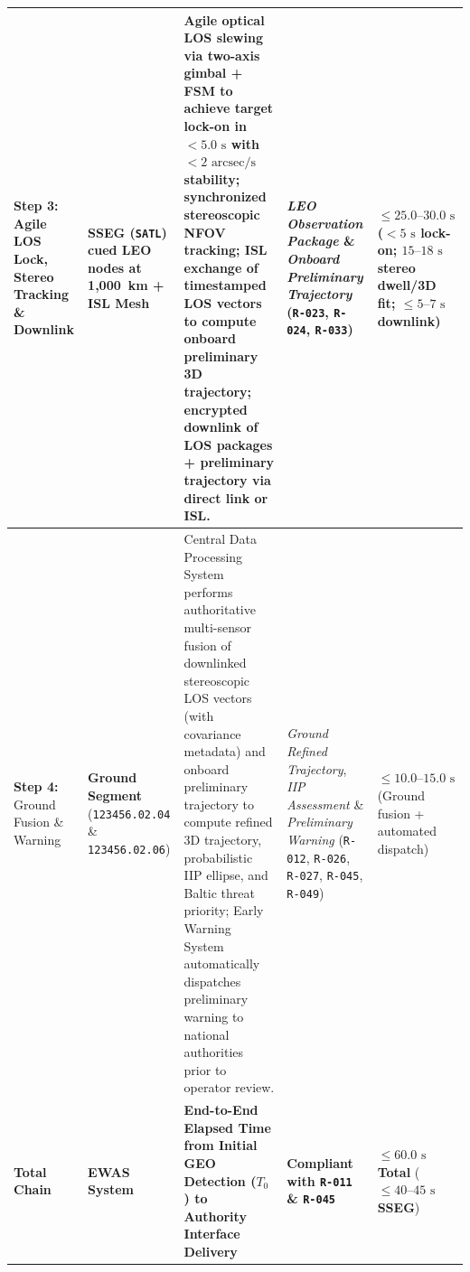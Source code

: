 \documentclass[11pt,a4paper]{article}
\providecommand{\abbr}[1]{#1}
\begin{document}
\begin{table}[H]
{\begin{tabularx}{\textwidth}{|>{\raggedright\arraybackslash}p{2.1cm}|>{\raggedright\arraybackslash}p{2.2cm}|>{\raggedright\arraybackslash}X|>{\raggedright\arraybackslash}p{2.3cm}|>{\raggedright\arraybackslash}p{1.9cm}|}
    \textbf{Step 3:} \newline Agile \abbr{LOS} Lock, Stereo Tracking \& Downlink & \textbf{SSEG (\texttt{SATL})} \newline 2 cued \abbr{LEO} nodes at 1,000~km + \textbf{\abbr{ISL} Mesh} & Agile optical \abbr{LOS} slewing via two-axis gimbal + \abbr{FSM} to achieve target lock-on in $< 5.0\text{ s}$ with $< 2\text{ arcsec/s}$ stability; synchronized stereoscopic \abbr{NFOV} tracking; \abbr{ISL} exchange of timestamped \abbr{LOS} vectors to compute onboard preliminary 3D trajectory; encrypted downlink of \abbr{LOS} packages + preliminary trajectory via direct link or \abbr{ISL}. & \emph{LEO Observation Package} \& \emph{Onboard Preliminary Trajectory} \newline (\texttt{R-023}, \texttt{R-024}, \texttt{R-033}) & \textbf{$\le 25.0\text{--}30.0\text{ s}$} \newline ($< 5\text{ s}$ lock-on; $15\text{--}18\text{ s}$ stereo dwell/3D fit; $\le 5\text{--}7\text{ s}$ downlink) \\ \hline
    \textbf{Step 4:} \newline Ground Fusion \& Warning & \textbf{Ground Segment} \newline (\texttt{123456.02.04} \& \texttt{123456.02.06}) & Central Data Processing System performs authoritative multi-sensor fusion of downlinked stereoscopic \abbr{LOS} vectors (with covariance metadata) and onboard preliminary trajectory to compute refined 3D trajectory, probabilistic \abbr{IIP} ellipse, and Baltic threat priority; Early Warning System automatically dispatches preliminary warning to national authorities prior to operator review. & \emph{Ground Refined Trajectory}, \emph{IIP Assessment} \& \emph{Preliminary Warning} \newline (\texttt{R-012}, \texttt{R-026}, \texttt{R-027}, \texttt{R-045}, \texttt{R-049}) & \textbf{$\le 10.0\text{--}15.0\text{ s}$} \newline (Ground fusion + automated dispatch) \\ \hline
    \textbf{Total Chain} & \textbf{EWAS System} & \textbf{End-to-End Elapsed Time from Initial \abbr{GEO} Detection ($T_0$) to Authority Interface Delivery} & \textbf{Compliant with \texttt{R-011} \& \texttt{R-045}} & \textbf{$\le 60.0\text{ s}$ Total} \newline (\textbf{$\le 40\text{--}45\text{ s}$ \abbr{SSEG}}) \\ \hline
\end{tabularx}}
\end{table}
\end{document}
